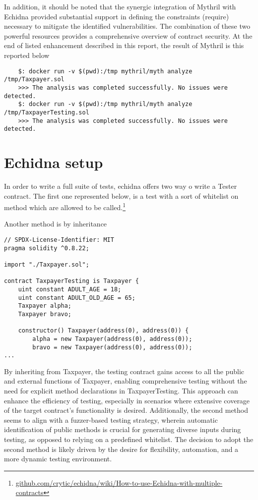 \documentclass{article}
\begin{document}
In addition, it should be noted that the synergic integration of Mythril with Echidna provided substantial support in defining the constraints (require) necessary to mitigate the identified vulnerabilities. The combination of these two powerful resources provides a comprehensive overview of contract security.
At the end of listed enhancement described in this report, the result of Mythril is this reported below
\begin{verbatim}
    $: docker run -v $(pwd):/tmp mythril/myth analyze /tmp/Taxpayer.sol
    >>> The analysis was completed successfully. No issues were detected.
    $: docker run -v $(pwd):/tmp mythril/myth analyze /tmp/TaxpayerTesting.sol
    >>> The analysis was completed successfully. No issues were detected.
\end{verbatim}

\section{Echidna setup}
In order to write a full suite of tests, echidna offers two way o write a Tester contract. The first one represented below, is a test with a sort of whitelist on method which are allowed to be called.\footnote{\href{https://github.com/crytic/echidna/wiki/How-to-use-Echidna-with-multiple-contracts}{github.com/crytic/echidna/wiki/How-to-use-Echidna-with-multiple-contracts}}

Another method is by inheritance
\begin{verbatim}
// SPDX-License-Identifier: MIT
pragma solidity ^0.8.22;

import "./Taxpayer.sol";

contract TaxpayerTesting is Taxpayer {
    uint constant ADULT_AGE = 18;
    uint constant ADULT_OLD_AGE = 65;
    Taxpayer alpha;
    Taxpayer bravo;

    constructor() Taxpayer(address(0), address(0)) {
        alpha = new Taxpayer(address(0), address(0));
        bravo = new Taxpayer(address(0), address(0));
...
\end{verbatim}
By inheriting from Taxpayer, the testing contract gains access to all the public and external functions of Taxpayer, enabling comprehensive testing without the need for explicit method declarations in TaxpayerTesting. This approach can enhance the efficiency of testing, especially in scenarios where extensive coverage of the target contract's functionality is desired. Additionally, the second method seems to align with a fuzzer-based testing strategy, wherein automatic identification of public methods is crucial for generating diverse inputs during testing, as opposed to relying on a predefined whitelist. The decision to adopt the second method is likely driven by the desire for flexibility, automation, and a more dynamic testing environment.
\end{document}
